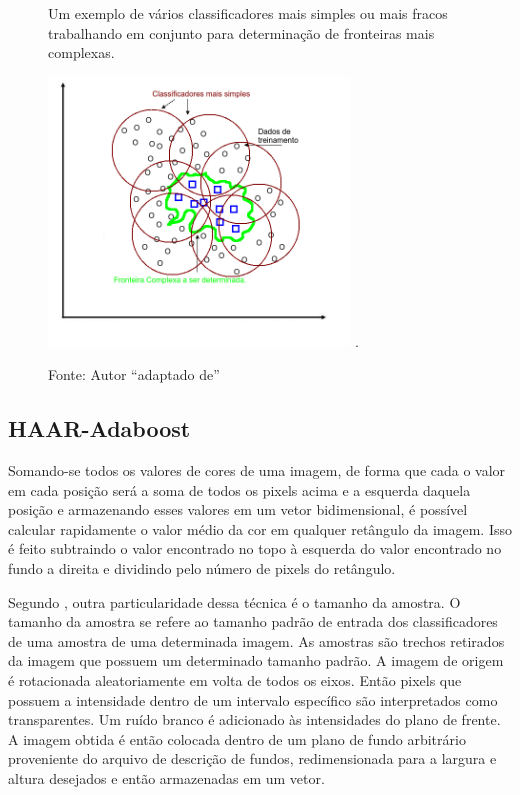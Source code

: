 \begin{figure}[!h]
\centering \caption{Um exemplo de vários classificadores mais simples ou mais fracos trabalhando em conjunto para determinação de fronteiras mais complexas.}
\includegraphics[width=8cm]{Imagens/Boost2.png}
\DeclareGraphicsExtensions.
\caption*{Fonte: Autor ``adaptado de'' }
\label{Fig:Boost2}
\end{figure}


	\subsection{HAAR-Adaboost}

Somando-se todos os valores de cores de uma imagem, de forma que cada o valor em cada posição será a soma de todos os pixels acima e a esquerda daquela posição e armazenando esses valores em um vetor bidimensional, é possível calcular rapidamente o valor médio da cor em qualquer retângulo da imagem. Isso é feito subtraindo o valor encontrado no topo à esquerda do valor encontrado no fundo a direita e dividindo pelo número de pixels do retângulo. 

Segundo , outra particularidade dessa técnica é o tamanho da amostra. O tamanho da amostra se refere ao tamanho padrão de entrada dos classificadores de uma amostra de uma determinada imagem. As amostras são trechos retirados da imagem que possuem um determinado tamanho padrão. A imagem de origem é rotacionada aleatoriamente em volta de todos os eixos. Então pixels que possuem a intensidade dentro de um intervalo específico são interpretados como transparentes. Um ruído branco é adicionado às intensidades do plano de frente. A imagem obtida é então colocada dentro de um plano de fundo arbitrário proveniente do arquivo de descrição de fundos, redimensionada para a largura e altura desejados e então armazenadas em um vetor.

